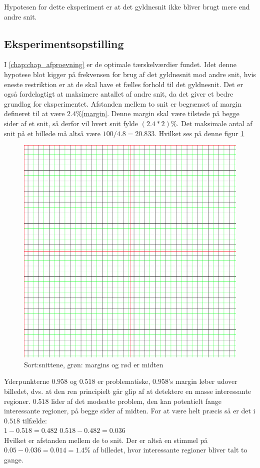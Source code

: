 {
Hypotesen for dette eksperiment er at det gyldnesnit ikke bliver brugt
mere end andre snit.
\subsection{Eksperimentsopstilling}
I \ref{chap:chap_afproevning} er de optimale tærskelværdier fundet.
Idet denne hypotese blot kigger på frekvensen for brug af det gyldnesnit
mod andre snit, hvis eneste restriktion er at de skal have et fælles
forhold til det gyldnesnit.
Det er også fordelagtigt at maksimere antallet af andre snit, da det
giver et bedre grundlag for eksperimentet.
Afstanden mellem to snit er begrænset af margin defineret til at være
$2.4\%$\ref{margin}. 
Denne margin skal være tilstede på begge sider af et snit, så derfor vil
hvert snit fylde $(2.4*2)\%$.
Det maksimale antal af snit på et billede må altså være
$100/4.8=20.833$. Hvilket ses på denne figur \ref{snitogmargin}
\begin{figure}[h!]
	\begin{center}
		\includegraphics[scale=0.3]{afsnit/resultater/billeder/20_cuts_med_margin}
	\end{center}
	\caption{Sort:snittene, grøn: margins og rød er midten}
	\label{snitogmargin}
\end{figure}
Yderpunkterne $0.958$ og $0.518$ er problematiske, $0.958$'s margin
løber udover billedet, dvs. at den ren principielt går glip af at
detektere en masse interessante regioner.
$0.518$ lider af det modsatte problem, den kan potentielt fange
interessante regioner, på begge sider af midten.
For at være helt præcis så er det i $0.518$ tilfælde:\\
$1-0.518 = 0.482$
$0.518-0.482=0.036$\\
Hvilket er afstanden mellem de to snit.
Der er altså en stimmel på $0.05-0.036 = 0.014 = 1.4\%$ af billedet,
hvor interessante regioner bliver talt to gange.

}
